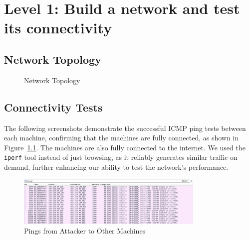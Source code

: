 \chapter{Level 1: Build a network and test its connectivity}

\section{Network Topology}

\begin{figure}[H]
\centering
{}
\caption{Network Topology}\label{fig:NetworkTopology}
\end{figure}

\section{Connectivity Tests}

The following screenshots demonstrate the successful ICMP ping tests between each machine, confirming that the machines are fully connected, as shown in Figure~\ref{fig:NetworkTopology}. The machines are also fully connected to the internet. We used the \texttt{iperf} tool instead of just browsing, as it reliably generates similar traffic on demand, further enhancing our ability to test the network's performance.

\begin{figure}[H]
\centering
\includegraphics[width=0.8\textwidth]{img/level1/level1-192-168-96-110.png}
\caption{Pings from Attacker to Other Machines}\label{fig:PingAttacker}
\end{figure}

